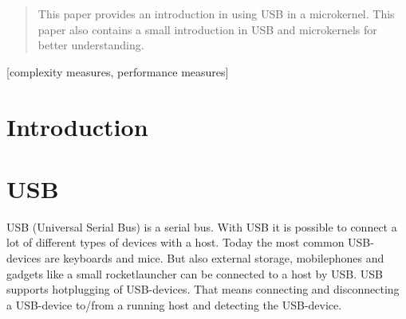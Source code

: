 \documentclass{acm_proc_article-sp}
\begin{document}
\maketitle
\begin{abstract}
This paper provides an introduction in using USB in a microkernel.
This paper also contains a small introduction in USB and microkernels for better understanding.


\end{abstract}

[complexity measures, performance measures]



\section{Introduction}
\section{USB}
USB (Universal Serial Bus) is a serial bus.
With USB it is possible to connect a lot of different types of devices with a host.
Today the most common USB-devices are keyboards and mice. But also external storage, mobilephones and gadgets like a small rocketlauncher can be connected to a host by USB. USB supports hotplugging of USB-devices. That means connecting and disconnecting a USB-device to/from a running host and detecting the USB-device.
\end{document}
